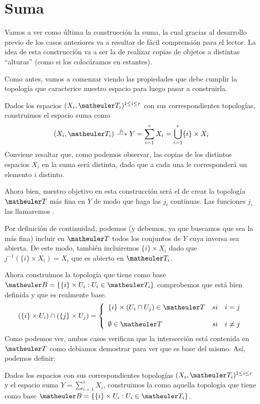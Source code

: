 \section{Suma}
Vamos a ver como última la construcción la suma, la cual gracias al desarrollo previo de los casos anteriores va a resultar de fácil comprensión para el lector. La idea de esta construcción va a ser la de realizar copias de objetos a distintas ``alturas'' (como si los colocáramos en estantes). 

Como antes, vamos a comenzar viendo las propiedades que debe cumplir la topología que caracterice nuestro espacio para luego pasar a construirla.

Dados los espacios $(X_i, \T_i)^{1\le i \le r}$ con sus correspondientes topologías, construimos el espacio suma como
\begin{equation}
(X_i, \T_i)\stackrel{j_i}\longrightarrow Y=\sum_{i=1}^rX_i=\bigcup_{i=1}^r\{i\}\times X_i
\end{equation}
Conviene resaltar que, como podemos observar, las copias de los distintos espacios $X_i$ en la suma será distinta, dado que a cada una le corresponderá un elemento $i$ distinto.

Ahora bien, nuestro objetivo en esta construcción será el de crear la topología $\T$ más fina en $Y$ de modo que haga las $j_i$ continuas. Las funciones $j_i$ las llamaremos .

Por definición de continuidad, podemos (y debemos, ya que buscamos que sea la más fina) incluir en $\T$ todos los conjuntos de $Y$ cuya inversa sea abierta.
De este modo, también incluiremos $\{i\}\times X_i$ dado que $j^{-1}(\{i\}\times X_i)=X_i$ que es abierto en $\T_i$.

Ahora construimos la topología que tiene como base $\B=\{\{i\}\times U_i:U_i\in\T_i\}$ comprobemos que está bien definida y que es realmente base.
\begin{equation}
(\{i\}\times U_i)\cap(\{j\}\times U_j)=
\left\{ \begin{array}{lcc}
\{i\}\times(U_i\cap U_j)\in\T &   si  & i=j \\
\\  \emptyset\in\T& si & i\neq j 
\end{array}
\right.
\end{equation}
Como podemos ver, ambos casos verifican que la intersección está contenida en $\T$ como debiamos demostrar para ver que es base del mismo.
Así, podemos definir:
\begin{defi}
	Dados los espacios con sus correspondientes topologías $(X_i, \T_i)^{1\le i \le r}$ y el espacio suma $Y=\sum_{i=1}^rX_i$, construimos la  como aquella topología que tiene como base $\B=\{\{i\}\times U_i:U_i\in\T_i\}$.
\end{defi}

